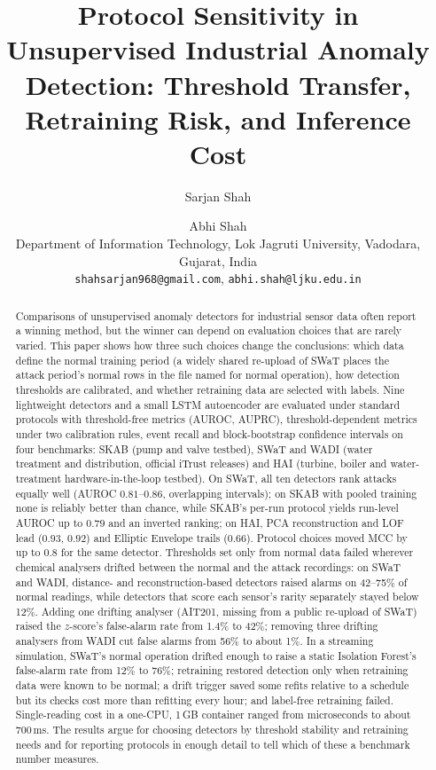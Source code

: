 \documentclass[11pt]{article}
\title{Protocol Sensitivity in Unsupervised Industrial Anomaly Detection:
Threshold Transfer, Retraining Risk, and Inference Cost}
\author{Sarjan Shah \and Abhi Shah\\[2pt]
\small Department of Information Technology, Lok Jagruti University, Vadodara, Gujarat, India\\
\small \texttt{shahsarjan968@gmail.com}, \texttt{abhi.shah@ljku.edu.in}}
\date{}
\begin{document}
\maketitle
\let\thefootnote\relax{}

\begin{abstract}
Comparisons of unsupervised anomaly detectors for industrial sensor data often
report a winning method, but the winner can depend on evaluation choices that are
rarely varied. This paper shows how three such choices change the conclusions:
which data define the normal training period (a widely shared re-upload of SWaT
places the attack period's normal rows in the file named for normal operation),
how detection thresholds are calibrated, and whether retraining data are selected
with labels. Nine lightweight detectors and a small LSTM autoencoder are
evaluated under standard protocols with threshold-free metrics (AUROC, AUPRC),
threshold-dependent metrics under two calibration rules, event recall and
block-bootstrap confidence intervals on four benchmarks: SKAB (pump and valve
testbed), SWaT and WADI (water treatment and distribution, official iTrust releases)
and HAI (turbine, boiler and water-treatment hardware-in-the-loop testbed). On SWaT,
all ten detectors rank attacks equally well (AUROC $0.81$--$0.86$, overlapping
intervals); on SKAB with pooled training none is reliably better than chance, while
SKAB's per-run protocol yields run-level AUROC up to $0.79$ and an inverted ranking;
on HAI, PCA reconstruction and LOF lead ($0.93$, $0.92$) and Elliptic Envelope trails
($0.66$). Protocol choices moved MCC by up to $0.8$ for the same detector. Thresholds
set only from normal data failed wherever chemical analysers drifted between the
normal and the attack recordings: on SWaT and WADI, distance- and reconstruction-based
detectors raised alarms on 42--75\% of normal readings, while detectors that score each
sensor's rarity separately stayed below 12\%. Adding one drifting analyser (AIT201,
missing from a public re-upload of SWaT) raised the $z$-score's false-alarm rate from
1.4\% to 42\%; removing three drifting analysers from WADI cut false alarms from 56\%
to about 1\%. In a streaming
simulation, SWaT's normal operation drifted enough to raise a static Isolation
Forest's false-alarm rate from 12\% to 76\%; retraining restored detection only when
retraining data were known to be normal; a drift trigger saved some refits relative to
a schedule but its checks cost more than refitting every hour; and label-free
retraining failed. Single-reading
cost in a one-CPU, 1\,GB container ranged from microseconds to about 700\,ms. The
results argue for choosing detectors by threshold stability and retraining needs and
for reporting protocols in enough detail to tell which of these a benchmark number
measures.
\end{abstract}
\end{document}
